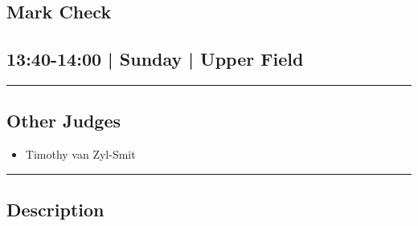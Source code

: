 \documentclass[10pt, A5]{article}
\begin{document}
		\begin{framed}
			\begin{minipage}{\textwidth}

			\setcounter{section}{115}
							\section{Mark Check}
						
			\subsection*{13:40-14:00 | Sunday | Upper Field}

			\vspace{0.25cm}
			\hrule
			\vspace{0.25cm}


			\subsection*{Other Judges}
							

				\begin{multicols}{2}

			\begin{itemize}
											\item Timothy van Zyl-Smit
								\end{itemize}

			\vfill\null
			\columnbreak

			\begin{itemize}
								\end{itemize}

			\vfill\null

			\end{multicols}

			\vspace{0.25cm}
			\hrule
			\vspace{0.25cm}

			\begin{minipage}{\textwidth}
			\subsection*{\faListAlt \: Description}
			
			\end{minipage}


	\end{minipage}
	\end{framed}

	
\end{document}
